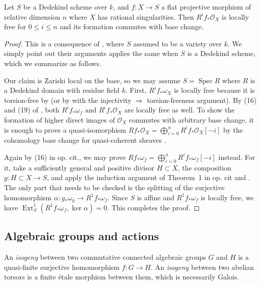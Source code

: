 \documentclass[reqno, letterpaper]{amsart}
\numberwithin{equation}{subsection}
\let\to\longrightarrow
\DeclareMathOperator{\Ext}{Ext}
\DeclareMathOperator{\Spec}{Spec}
\begin{document}
	\begin{lemma} \label{lem:Kollar-Kovacs}
		Let $S$ be a Dedekind scheme over $k$, and $f : X \to S$ a flat projective morphism of relative dimension $n$ where $X$ has rational singularities. Then $R^if_* \mathcal O_X$ is locally free for $0 \le i \le n$ and its formation commutes with base change.
	\end{lemma}
	\begin{proof}
		This is a consequence of \cite[Theorem~1]{kol-kov25}, where $S$ assumed to be a variety over $k$. We simply point out their arguments applies the same when $S$ is a Dedekind scheme, which we summarize as follows.
		
		\medskip
		
		Our claim is Zariski local on the base, so we may assume $S = \Spec R$ where $R$ is a Dedekind domain with residue field $k$. First, $R^if_* \omega_X$ is locally free because it is torsion-free by \cite[Theorem~8.6.1]{mur24} (or by \cite[Theorem~A(ii)]{mur25} with the injectivity $\Longrightarrow$ torsion-freeness argument). By (16) and (19) of \cite{kol-kov25}, both $R^if_* \omega_f$ and $R^if_* \mathcal O_X$ are locally free as well. To show the formation of higher direct images of $\mathcal O_X$ commutes with arbitrary base change, it is enough to prove a quasi-isomorphism $Rf_* \mathcal O_X = \bigoplus_{i=0}^n R^if_* \mathcal O_X [-i]$ by the cohomology base change for quasi-coherent sheaves \cite[Tag~08IB]{stacks-project}.
		
		Again by (16) in op. cit., we may prove $Rf_* \omega_f = \bigoplus_{i=0}^n R^if_* \omega_f [-i]$ instead. For it, take a sufficiently general and positive divisor $H \subset X$, the composition $g : H \subset X \to S$, and apply the induction argument of Theorem~1 in op. cit and \cite[Theorem~3.1]{kol86II}. The only part that needs to be checked is the splitting of the surjective homomorphism $\alpha : g_* \omega_g \to R^1f_* \omega_f$. Since $S$ is affine and $R^1f_* \omega_f$ is locally free, we have $\Ext^1_S (R^1f_* \omega_f, \ker \alpha) = 0$. This completes the proof.
	\end{proof}
	
	
	
	\subsection{Algebraic groups and actions}
		An \emph{isogeny} between two commutative connected algebraic groups $G$ and $H$ is a quasi-finite surjective homomorphism $f : G \to H$. An \emph{isogeny} between two abelian torsors is a finite \'etale morphism between them, which is necessarily Galois.
		
\end{document}
